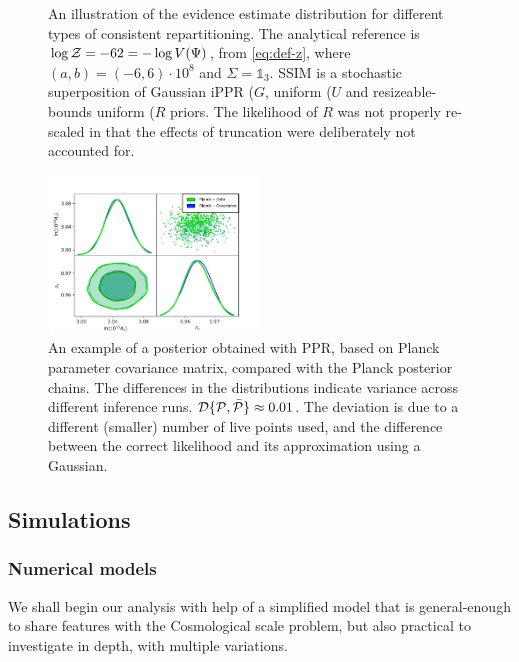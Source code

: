 \documentclass[usenatbib]{mnras}
\begin{document}
\begin{figure}

\caption{An illustration of the evidence estimate distribution for
  different types of consistent repartitioning. The analytical
  reference is \(\log {\cal Z} = -62 = - \log V(\Psi)\), from
  \cref{eq:def-z}, where \((a,b)=(-6, 6)\cdot 10^{8}\) and
  \(\Sigma=\mathds{1}_{3}\). SSIM is a stochastic superposition of
  Gaussian iPPR (\(G\), uniform (\(U\) and resizeable-bounds uniform
  (\(R\) priors. The likelihood of \(R\) was not properly re-scaled in
  that the effects of truncation were deliberately not accounted for.
  \label{fig:hist}}
\end{figure}




\begin{figure}
  \includegraphics[width=0.5\textwidth]{./illustrations/triangle-fit.pdf}
  \caption{An example of a posterior obtained with PPR, based on
    Planck parameter covariance matrix, compared with the Planck
    posterior chains. The differences in the distributions indicate
    variance across different inference runs.
    ${\cal D}\{ {\cal P}, \bar{\cal P}\} \approx 0.01$. The deviation
    is due to a different (smaller) number of live points used, and
    the difference between the correct likelihood and its
    approximation using a Gaussian. \label{fig:overlay-posteriors}}
\end{figure}


\subsection{Simulations}
\subsubsection{Numerical models}

We shall begin our analysis with help of a simplified model that is
general-enough to share features with the Cosmological scale problem,
but also practical to investigate in depth, with multiple variations.
\end{document}
